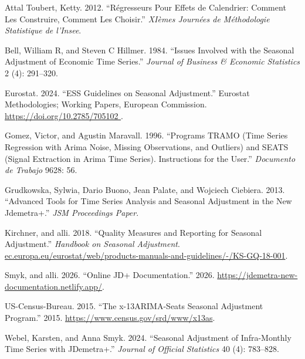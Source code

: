 \documentclass[
  letterpaper,
  DIV=11,
  numbers=noendperiod]{scrreprt}
\newlength{\cslhangindent}
\newlength{\cslentryspacingunit} %
\newenvironment{CSLReferences}[2] %
 {%
  \setlength{\parindent}{0pt}
  \ifodd #1
  \let\oldpar\par
  \def\par{\hangindent=\cslhangindent\oldpar}
  \fi
  \setlength{\parskip}{#2\cslentryspacingunit}
 }%
 {}
\begin{document}

\hypertarget{refs}{}
\begin{CSLReferences}{1}{0}
\leavevmode{}%
Attal Toubert, Ketty. 2012. {``R{é}gresseurs Pour Effets de Calendrier:
Comment Les Construire, Comment Les Choisir.''} \emph{XI{è}mes
Journ{é}es de M{é}thodologie Statistique de l'Insee}.

\leavevmode{}%
Bell, William R, and Steven C Hillmer. 1984. {``Issues Involved with the
Seasonal Adjustment of Economic Time Series.''} \emph{Journal of
Business \& Economic Statistics} 2 (4): 291--320.

\leavevmode{}%
Eurostat. 2024. {``ESS Guidelines on Seasonal Adjustment.''} Eurostat
Methodologies; Working Papers, European Commission.
\href{https://doi.org/10.2785/705102\%20}{https://doi.org/10.2785/705102
}.

\leavevmode{}%
Gomez, Victor, and Agustin Maravall. 1996. {``Programs TRAMO (Time
Series Regression with Arima Noise, Missing Observations, and Outliers)
and SEATS (Signal Extraction in Arima Time Series). Instructions for the
User.''} \emph{Documento de Trabajo} 9628: 56.

\leavevmode{}%
Grudkowska, Sylwia, Dario Buono, Jean Palate, and Wojciech Ciebiera.
2013. {``Advanced Tools for Time Series Analysis and Seasonal Adjustment
in the New Jdemetra+.''} \emph{JSM Proceedings Paper}.

\leavevmode{}%
Kirchner, and alli. 2018. {``Quality Measures and Reporting for Seasonal
Adjustment.''} \emph{Handbook on Seasonal Adjustment}.
\href{https://ec.europa.eu/eurostat/web/products-manuals-and-guidelines/-/KS-GQ-18-001}{ec.europa.eu/eurostat/web/products-manuals-and-guidelines/-/KS-GQ-18-001}.

\leavevmode{}%
Smyk, and alli. 2026. {``Online JD+ Documentation.''} 2026.
\url{https://jdemetra-new-documentation.netlify.app/}.

\leavevmode{}%
US-Census-Bureau. 2015. {``The x-13ARIMA-Seats Seasonal Adjustment
Program.''} 2015. \url{https://www.census.gov/srd/www/x13as}.

\leavevmode{}%
Webel, Karsten, and Anna Smyk. 2024. {``Seasonal Adjustment of
Infra-Monthly Time Series with JDemetra+.''} \emph{Journal of Official
Statistics} 40 (4): 783--828.

\end{CSLReferences}
\end{document}
